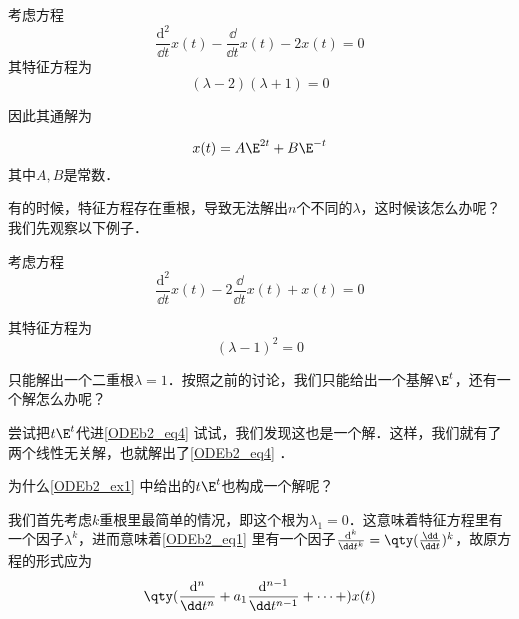 \begin{example}{}
考虑方程
\begin{equation}
\frac{\mathrm{d}^2}{\dd t}x(t)-\frac{\dd }{\dd t}x(t)-2x(t)=0
\end{equation}
其特征方程为
\begin{equation}
(\lambda-2)(\lambda+1)=0
\end{equation}

因此其通解为

\begin{equation}
x(t)=A\E^{2t}+B\E^{-t}
\end{equation}
其中$A, B$是常数．




\end{example}


有的时候，特征方程存在重根，导致无法解出$n$个不同的$\lambda$，这时候该怎么办呢？我们先观察以下例子．

\begin{example}{}\label{ODEb2_ex1}
考虑方程
\begin{equation}\label{ODEb2_eq4}
\frac{\mathrm{d}^2}{\dd t}x(t)-2\frac{\dd }{\dd t}x(t)+x(t)=0
\end{equation}

其特征方程为
\begin{equation}
(\lambda-1)^2=0
\end{equation}

只能解出一个二重根$\lambda=1$．按照之前的讨论，我们只能给出一个基解$\E^{t}$，还有一个解怎么办呢？

尝试把$t\E^{t}$代进\autoref{ODEb2_eq4} 试试，我们发现这也是一个解．这样，我们就有了两个线性无关解，也就解出了\autoref{ODEb2_eq4} ．




\end{example}




为什么\autoref{ODEb2_ex1} 中给出的$t\E^{t}$也构成一个解呢？

我们首先考虑$k$重根里最简单的情况，即这个根为$\lambda_1=0$．这意味着特征方程里有一个因子$\lambda^k$，进而意味着\autoref{ODEb2_eq1} 里有一个因子$\frac{\mathrm{d}^k}{\dd t^k}=\qty(\frac{\dd}{\dd t})^k$，故原方程的形式应为
\begin{equation}
\qty(\frac{\mathrm{d}^n}{\dd t^n}+a_1\frac{\mathrm{d}^{n-1}}{\dd t^{n-1}}+\cdots+)x(t)
\end{equation}
























